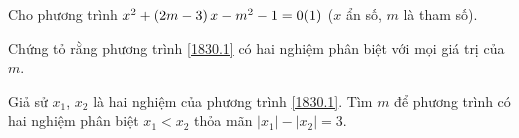 \begin{ex}%
	Cho phương trình $ x^2+\left(2m-3\right)x-m^2-1=0\refstepcounter{equation}\hfill (\theequation)\label{1830.1}$ ($x$ ẩn số, $m$ là tham số).
	\begin{listEX}
		\item Chứng tỏ rằng phương trình \eqref{1830.1} có hai nghiệm phân biệt với mọi giá trị của $ m $.
		\item Giả sử $ x_1$, $x_2 $ là hai nghiệm của phương trình \eqref{1830.1}. Tìm $m$ để phương trình  có hai nghiệm phân biệt $x_1<x_2$ thỏa mãn $ \left|x_1\right|-\left|x_2\right|=3 $.
	\end{listEX}
\end{ex}

